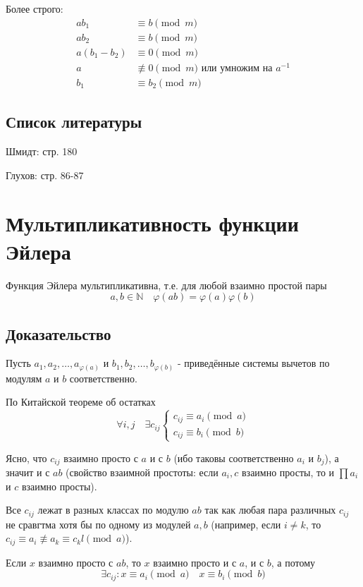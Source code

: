 \documentclass{article}
\begin{document}
Более строго:
\begin{align*}
ab_1 &\equiv b \pmod{m} \\
ab_2 &\equiv b \pmod{m} \\
a(b_1 - b_2) &\equiv 0 \pmod{m} \\
a & \not\equiv 0 \pmod{m} \text{ или умножим на } a^{-1} \\
b_1 &\equiv b_2 \pmod{m}
\end{align*}

\subsection*{Список литературы}
Шмидт: стр. 180

Глухов: стр. 86-87



\newpage
\section{Мультипликативность функции Эйлера}
Функция Эйлера мультипликативна, т.е. для любой взаимно простой пары \[a, b \in \mathbb N \quad \varphi(ab) = \varphi(a) \varphi(b)\]

\subsection{Доказательство}
Пусть $a_1, a_2, \dots, a_{\varphi(a)}$ и $b_1, b_2, \dots, b_{\varphi(b)}$ - приведённые системы вычетов по модулям $a$ и $b$ соответственно.

По Китайской теореме об остатках
\[\forall i, j \quad \exists c_{ij} \begin{cases}
c_{ij} \equiv a_i \pmod{a} \\
c_{ij} \equiv b_i \pmod{b}
\end{cases}\]

Ясно, что $c_{ij}$ взаимно просто с $a$ и с $b$ (ибо таковы соответственно $a_i$ и $b_j$), а значит и с $ab$ (свойство взаимной простоты: если $a_i, c$ взаимно просты, то и $\prod a_i$ и $c$ взаимно просты).

Все $c_{ij}$ лежат в разных классах по модулю $ab$ так как любая пара различных $c_{ij}$ не сравгтма хотя бы по одному из модулей $a, b$ (например, если $i \neq k$, то $c_{ij} \equiv a_i \not \equiv a_k \equiv c_kl \pmod{a}$).

Если $x$ взаимно просто с $ab$, то $x$ взаимно просто и с $a$, и с $b$, а потому \[\exists c_{ij} : x \equiv a_i \pmod{a} \quad x \equiv b_i \pmod{b}\]
\end{document}
